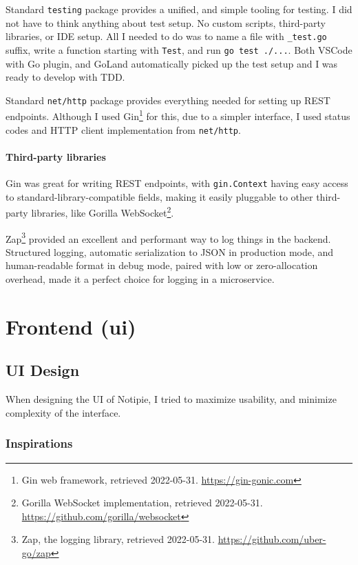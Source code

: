 Standard \texttt{testing} package provides a unified, and simple tooling
for testing. I did not have to think anything about test setup. No
custom scripts, third-party libraries, or IDE setup. All I needed to do
was to name a file with \texttt{\_test.go} suffix, write a function
starting with \texttt{Test}, and run \texttt{go\ test\ ./...}. Both
VSCode with Go plugin, and GoLand automatically picked up the test setup
and I was ready to develop with TDD.

Standard \texttt{net/http} package provides everything needed for
setting up REST endpoints. Although I used Gin\footnote{Gin web
framework, retrieved 2022-05-31. \url{https://gin-gonic.com}} for
this, due to a simpler interface, I used status codes and HTTP client
implementation from \texttt{net/http}.

\paragraph{Third-party libraries}\label{third-party-libraries}

Gin was great for writing REST endpoints, with \texttt{gin.Context}
having easy access to standard-library-compatible fields, making it
easily pluggable to other third-party libraries, like Gorilla
WebSocket\footnote{Gorilla WebSocket implementation, retrieved
2022-05-31. \url{https://github.com/gorilla/websocket}}.

Zap\footnote{Zap, the logging library, retrieved 2022-05-31.
\url{https://github.com/uber-go/zap}} provided an excellent and
performant way to log things in the backend. Structured logging,
automatic serialization to JSON in production mode, and human-readable
format in debug mode, paired with low or zero-allocation overhead, made
it a perfect choice for logging in a microservice.

\section{Frontend (ui)}\label{frontend-ui}

\subsection{UI Design}\label{ui-design}

When designing the UI of Notipie, I tried to maximize usability, and
minimize complexity of the interface.

\subsubsection{Inspirations}\label{inspirations}

